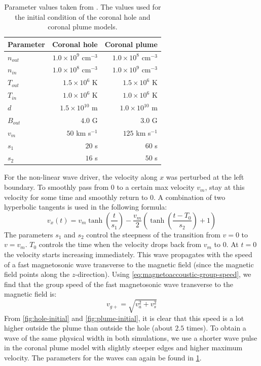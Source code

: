 \begin{table}[H]
	\centering
	\begin{tabular}{|l|r|r|}
		\toprule
		Parameter & Coronal hole & Coronal plume\\
		\midrule
		$n_{out}$ & $1.0\times 10^9$ cm$^{-3}$ & $1.0\times 10^8$ cm$^{-3}$\\
		$n_{in}$ & $1.0\times 10^8$ cm$^{-3}$ & $1.0\times 10^9$ cm$^{-3}$\\
		$T_{out}$ & $1.5\times 10^6$ K & $1.5\times 10^6$ K\\
		$T_{in}$ & $1.0\times10^6$ K & $1.0\times10^6$ K\\
		$d$ & $1.5\times10^{10}$ m& $1.0\times10^{10}$ m \\
		$B_{out} $ & $4.0$ G & $3.0$ G\\
		\midrule
		$v_m$ & $50$ km s$^{-1}$ & $125$ km s$^{-1}$ \\
		$s_1$ & $20$ s & $60$ s \\
		$s_2$ & $16$ s& $50$ s\\
		\bottomrule
	\end{tabular}
	\caption{Parameter values taken from \cite{coronal-hole}. The values used for the initial condition of the coronal hole and coronal plume models.}
	\label{tab:parameters-hole}
\end{table}
For the non-linear wave driver, the velocity along $x$ was perturbed at the left boundary. 
To smoothly pass from $0$ to a certain max velocity $v_m$, stay at this velocity for some time and smoothly return to $0$. A combination of two hyperbolic tangents is used in the following formula:
\begin{equation}
	v_x(t) = v_m \tanh \left( \frac{t}{s_1} \right) - \frac{v_m}{2} \left( \tanh \left( \frac{t-T_0}{s_2} \right) +1 \right) 
\end{equation}
The parameters $s_1$ and $s_2$ control the steepness of the transition from $v=0$ to $v=v_m$.
$T_0$ controls the time when the velocity drops back from $v_m$ to $0$. At $t=0$ the velocity starts increasing immediately.
This wave propagates with the speed of a fast magnetosonic wave transverse to the magnetic field (since the magnetic field points along the $z$-direction).
Using \cref{eq:magnetoaccoustic-group-speed}, we find that the group speed of the fast magnetosonic wave transverse to the magnetic field is:
\begin{equation*}
	v_{g+} = \sqrt{v_a^2+v_s^2}
\end{equation*}
From \cref{fig:hole-initial} and \cref{fig:plume-initial}, it is clear that this speed is a lot higher outside the plume than outside the hole (about $2.5$ times).
To obtain a wave of the same physical width in both simulations, we use a shorter wave pulse in the coronal plume model with slightly steeper edges and higher maximum velocity.
The parameters for the waves can again be found in \cref{tab:parameters-hole}.


